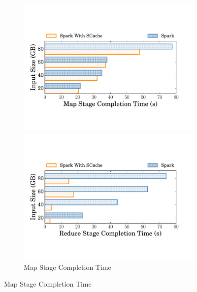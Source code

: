 \begin{figure}
	\centering
	\begin{minipage}[t]{.32\linewidth}
		\begin{subfigure}{\linewidth}
			\begin{minipage}{\linewidth}
				\includegraphics[width=\linewidth]{fig/groupbymapstage}
				\caption{Map Stage Completion Time}
				\label{fig:mapstage}
			\end{minipage}
			\begin{minipage}{\linewidth}
				\includegraphics[width=\linewidth]{fig/groupbyreducestage}

\end{minipage}
\end{subfigure}
\end{minipage}
\end{figure}
